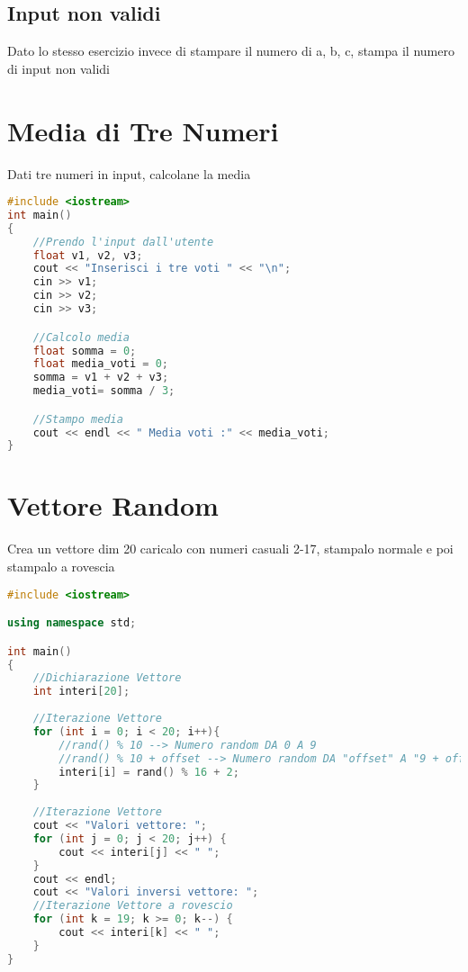 \documentclass{article}
\begin{document}
\subsection{Input non validi} Dato lo stesso esercizio invece di stampare il numero di a, b, c, stampa il numero di input non validi
\pagebreak
\section{Media di Tre Numeri} Dati tre numeri in input, calcolane la media

\begin{lstlisting}[language=C++]
#include <iostream>
int main() 
{ 
    //Prendo l'input dall'utente
    float v1, v2, v3;
    cout << "Inserisci i tre voti " << "\n";
    cin >> v1;
    cin >> v2;
    cin >> v3;   

    //Calcolo media
    float somma = 0;
    float media_voti = 0;
    somma = v1 + v2 + v3;  
    media_voti= somma / 3;

    //Stampo media
    cout << endl << " Media voti :" << media_voti; 
}
\end{lstlisting}
\vspace*{\fill}

\pagebreak
\section{Vettore Random} Crea un vettore dim 20 caricalo con numeri casuali 2-17, stampalo normale e poi stampalo a rovescia

\begin{lstlisting}[language=C++]
#include <iostream>

using namespace std;

int main()
{
    //Dichiarazione Vettore
    int interi[20];
    
    //Iterazione Vettore
    for (int i = 0; i < 20; i++){
        //rand() % 10 --> Numero random DA 0 A 9 
        //rand() % 10 + offset --> Numero random DA "offset" A "9 + offset" (es. offset = 10 cosa restituisce?)
        interi[i] = rand() % 16 + 2;
    }
    
    //Iterazione Vettore
    cout << "Valori vettore: ";
    for (int j = 0; j < 20; j++) {
        cout << interi[j] << " ";
    }
    cout << endl;
    cout << "Valori inversi vettore: ";
    //Iterazione Vettore a rovescio
    for (int k = 19; k >= 0; k--) {
        cout << interi[k] << " ";
    }
}
\end{lstlisting}
\vspace*{\fill}
\end{document}
